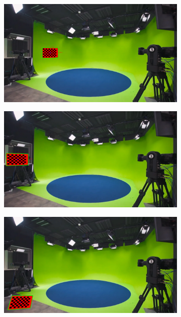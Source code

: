 \begin{figure}[h]
    \centering
    \begin{subfigure}[b]{0.45\textwidth}
        \includegraphics[width=\textwidth]{Images/04calibration/6.png}
        \caption{}
        \label{fig:a1}
    \end{subfigure}
    \hfill
    \begin{subfigure}[b]{0.45\textwidth}
        \includegraphics[width=\textwidth]{Images/04calibration/7.png}
        \caption{}
        \label{fig:b1}
    \end{subfigure}
    
    \vspace{0.5cm}
    
    \begin{subfigure}[b]{0.45\textwidth}
        \includegraphics[width=\textwidth]{Images/04calibration/8.png}
        \caption{}
        \label{fig:c1}
    \end{subfigure}


\end{figure}
